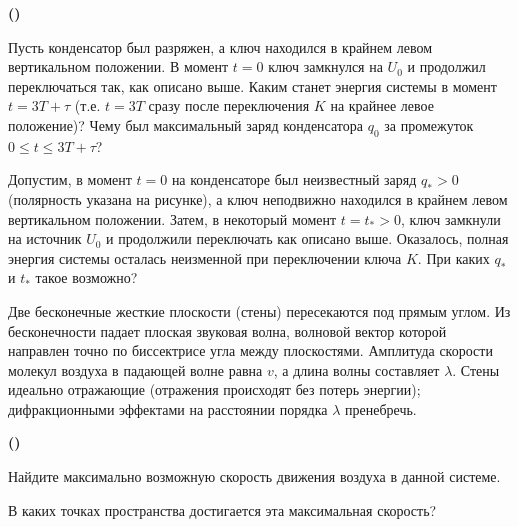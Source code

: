 \setcounter{taskstar}{0}
\begin{list}{\textbf{()}\ }{
    \setlength{\leftmargin}{18pt}%
      \setlength{\labelwidth}{0pt}%
      \setlength{\labelsep}{0pt}%
      \setlength{\itemsep}{6pt}%
      \setlength{\topsep}{6pt}}
    \item Пусть конденсатор был разряжен, а ключ находился в крайнем левом вертикальном положении. В момент $t=0$ ключ замкнулся на $U_0$ и продолжил переключаться так, как описано выше. Каким станет энергия системы в момент $t=3T+\tau$ (т.е. $t=3T$ сразу после переключения $K$ на крайнее левое положение)? Чему был максимальный заряд конденсатора $q_0$ за промежуток $0\leq t \leq 3T+\tau$?
    \item Допустим, в момент $t=0$ на конденсаторе был неизвестный заряд $q_*>0$ (полярность указана на рисунке), а ключ неподвижно находился в крайнем левом вертикальном положении. Затем, в некоторый момент $t=t_*>0$, ключ замкнули на источник $U_0$ и продолжили переключать как описано выше. Оказалось, полная энергия системы осталась неизменной при переключении ключа $K$. При каких $q_*$ и $t_*$ такое возможно?
\end{list}


Две бесконечные жесткие плоскости (стены) пересекаются под прямым углом. Из бесконечности падает плоская звуковая волна, волновой вектор которой направлен точно по биссектрисе угла между плоскостями. Амплитуда скорости молекул воздуха в падающей волне равна $v$, а длина волны составляет $\lambda$. Стены идеально отражающие (отражения происходят без потерь энергии); дифракционными эффектами на расстоянии порядка $\lambda$ пренебречь.

\setcounter{taskstar}{0}
\begin{list}{\textbf{()}\ }{
    \setlength{\leftmargin}{18pt}%
      \setlength{\labelwidth}{0pt}%
      \setlength{\labelsep}{0pt}%
      \setlength{\itemsep}{6pt}%
      \setlength{\topsep}{6pt}}
    \item Найдите максимально возможную скорость движения воздуха в данной системе.
    \item В каких точках пространства достигается эта максимальная скорость?
\end{list}